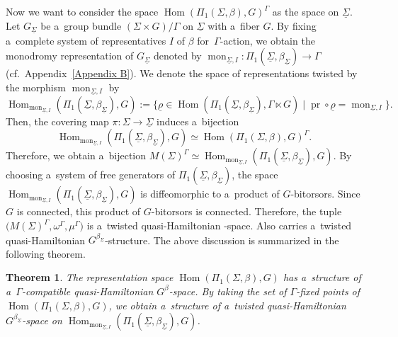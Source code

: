 \documentclass[pdftex]{sigma}
\numberwithin{equation}{section}
\newtheorem{Theorem}{Theorem}[section]
\theoremstyle{definition}
\newcommand{\Hom}{\operatorname{Hom}}
\newcommand{\mon}{\operatorname{mon}}
\newcommand{\pr}{\operatorname{pr}}
\begin{document}
Now we want to consider the space $\Hom(\Pi_1(\Sigma,\beta),G)^{\Gamma}$ as the space on $\underline{\Sigma}$.
Let $G_{\underline{\Sigma}}$ be a~group bundle $(\Sigma \times G) /\Gamma$ on $\underline{\Sigma}$ with a~fiber $G$.
By fixing a~complete system of representatives $I$ of $\beta$ for~$\Gamma$-action,
we obtain the monodromy representation of $G_{\underline{\Sigma}}$ denoted by $\mon_{\underline{\Sigma},I} \colon \Pi_1(\underline{\Sigma},\beta_{\underline{\Sigma}}) \to \Gamma$ (cf.\ Appendix~\ref{Appendix B}).
We denote the space of representations twisted by the morphism $\mon_{\underline{\Sigma},I}$ by
\[
\Hom_{\mon_{\underline{\Sigma},I}}(\Pi_1(\underline{\Sigma},\beta_{\underline{\Sigma}}),G):= \bigr\{\underline{\rho} \in \Hom(\Pi_1(\underline{\Sigma},\beta_{\underline{\Sigma}}),\Gamma \ltimes G)\mid \pr \circ \underline{\rho} = \mon_{\underline{\Sigma},I}\bigr\}.
\]
Then, the covering map $\pi \colon \Sigma \to \underline{\Sigma}$ induces a~bijection
\[
\Hom_{\mon_{\underline{\Sigma},I}}(\Pi_1(\underline{\Sigma},\beta_{\underline{\Sigma}}),G) \simeq \Hom(\Pi_1(\Sigma,\beta),G)^{\Gamma}.
\]
Therefore, we obtain a~bijection
$M(\Sigma)^{\Gamma} \simeq \Hom_{\mon_{\underline{\Sigma},I}}(\Pi_1(\underline{\Sigma},\beta_{\underline{\Sigma}}),G)$.
By choosing a~system of free generators of $\Pi_1(\underline{\Sigma},\beta_{\underline{\Sigma}})$, the space $\Hom_{\mon_{\underline{\Sigma},I}}(\Pi_1(\underline{\Sigma},\beta_{\underline{\Sigma}}),G)$ is diffeomorphic to a~product of $G$-bitorsors.
Since $G$ is connected, this product of $G$-bitorsors is connected.
Therefore, the tuple~${\bigl(M(\Sigma)^{\Gamma}, \omega^{\Gamma}, \mu^{\Gamma}\bigr)}$ is a~twisted quasi-Hamiltonian -space.
Also \smash{$\Hom_{\mon_{\underline{\Sigma},I}}(\Pi_1(\underline{\Sigma},\beta_{\underline{\Sigma}}),G)$} carries a~twisted quasi-Hamiltonian $G^{\beta_{\underline{\Sigma}}}$-structure.
The above discussion is summarized in the following theorem.
\begin{Theorem}\label{q-Ham str on rep sp}
 The representation space $\Hom(\Pi_1(\Sigma,\beta),G)$ has a~structure of a~$\Gamma$-compatible quasi-Hamiltonian $G^{\beta}$-space.
 By taking the set of $\Gamma$-fixed points of $\Hom(\Pi_1(\Sigma,\beta),G)$, we obtain a~structure of a~twisted quasi-Hamiltonian $G^{\beta_{\underline{\Sigma}}}$-space on $\Hom_{\mon_{\underline{\Sigma}, I}}(\Pi_1(\underline{\Sigma},\beta_{\underline{\Sigma}}),G)$.
\end{Theorem}
\end{document}

